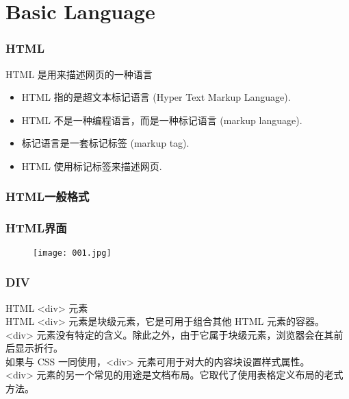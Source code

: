\documentclass[notheorems,mathserif,table,compress]{beamer}  %
\begin{document}
\section{Basic Language}
\begin{frame}
 \frametitle{HTML}
 HTML 是用来描述网页的一种语言
 	\begin{itemize}
 	\item HTML 指的是超文本标记语言 (Hyper Text Markup Language).
 	\item HTML 不是一种编程语言，而是一种标记语言 (markup language).
 	\item 标记语言是一套标记标签 (markup tag).
 	\item HTML 使用标记标签来描述网页.
 	\end{itemize}
\end{frame}
\begin{frame}
 \frametitle{HTML一般格式}
 	
\end{frame}
\begin{frame}
\frametitle{HTML界面}
 	\begin{figure}[!ht]
	\centering\texttt{[image: 001.jpg]}
	\end{figure}
\end{frame}
\begin{frame}
\frametitle{DIV}
 	HTML <div> 元素\\
HTML <div> 元素是块级元素，它是可用于组合其他 HTML 元素的容器。\\
<div> 元素没有特定的含义。除此之外，由于它属于块级元素，浏览器会在其前后显示折行。\\
如果与 CSS 一同使用，<div> 元素可用于对大的内容块设置样式属性。\\
<div> 元素的另一个常见的用途是文档布局。它取代了使用表格定义布局的老式方法。
\end{frame}
\end{document}
